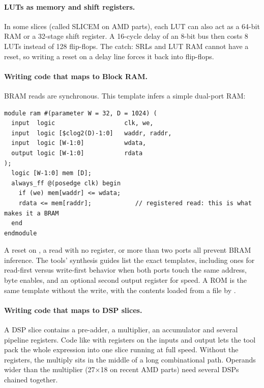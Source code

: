 \paragraph{LUTs as memory and shift registers.} In some slices (called SLICEM on AMD parts), each LUT can also act as a 64-bit RAM or a 32-stage shift register. A 16-cycle delay of an 8-bit bus then costs 8 LUTs instead of 128 flip-flops. The catch: SRLs and LUT RAM cannot have a reset, so writing a reset on a delay line forces it back into flip-flops.

\paragraph{Writing code that maps to Block RAM.} BRAM reads are synchronous. This template infers a simple dual-port RAM:

\begin{lstlisting}
module ram #(parameter W = 32, D = 1024) (
  input  logic                   clk, we,
  input  logic [$clog2(D)-1:0]   waddr, raddr,
  input  logic [W-1:0]           wdata,
  output logic [W-1:0]           rdata
);
  logic [W-1:0] mem [D];
  always_ff @(posedge clk) begin
    if (we) mem[waddr] <= wdata;
    rdata <= mem[raddr];            // registered read: this is what makes it a BRAM
  end
endmodule
\end{lstlisting}

A reset on , a read with no register, or more than two ports all prevent BRAM inference. The tools' synthesis guides list the exact templates, including ones for read-first versus write-first behavior when both ports touch the same address, byte enables, and an optional second output register for speed. A ROM is the same template without the write, with the contents loaded from a file by .

\paragraph{Writing code that maps to DSP slices.} A DSP slice contains a pre-adder, a multiplier, an accumulator and several pipeline registers. Code like  with registers on the inputs and output lets the tool pack the whole expression into one slice running at full speed. Without the registers, the multiply sits in the middle of a long combinational path. Operands wider than the multiplier (27$\times$18 on recent AMD parts) need several DSPs chained together.

